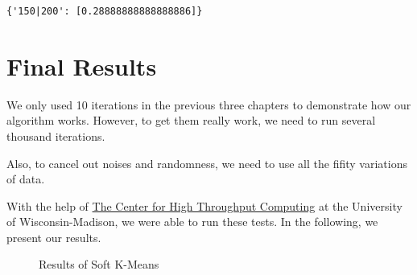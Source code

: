 \documentclass[
  letterpaper,
  DIV=11,
  numbers=noendperiod]{scrreprt}
\begin{document}
\begin{verbatim}
{'150|200': [0.28888888888888886]}
\end{verbatim}


\chapter{Final Results}\label{sec-final-res}

We only used 10 iterations in the previous three chapters to demonstrate
how our algorithm works. However, to get them really work, we need to
run several thousand iterations.

Also, to cancel out noises and randomness, we need to use all the fifity
variations of data.

With the help of \href{https://chtc.cs.wisc.edu/}{The Center for High
Throughput Computing} at the University of Wisconsin-Madison, we were
able to run these tests. In the following, we present our results.

\begin{figure}


\caption{\label{fig-res-soft-kmeans}Results of Soft K-Means}

\end{figure}%
\end{document}

